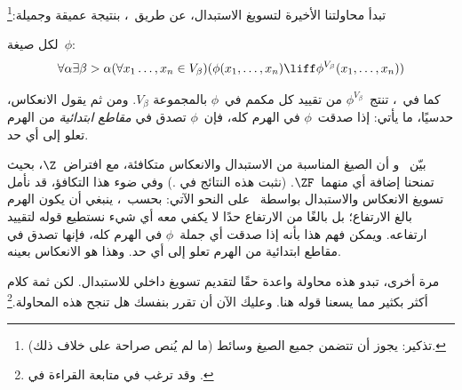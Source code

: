 \documentclass[../../../include/open-logic-section]{subfiles}
\begin{document}

تبدأ محاولتنا الأخيرة لتسويغ الاستبدال، عن طريق~\stagesinex، بنتيجة
عميقة وجميلة:\footnote{تذكير: يجوز أن تتضمن جميع الصيغ وسائط (ما لم
يُنص صراحة على خلاف ذلك).}
\begin{thm}
لكل صيغة~$\phi$:
\[
\forall \alpha \exists \beta > \alpha (\forall x_1 \ldots, x_n \in
V_\beta)(\phi(x_1, \ldots, x_n) \liff \phi^{V_\beta}(x_1, \ldots, x_n))
\]
\end{thm}
\noindent
كما في~،
تنتج~$\phi^{V_\beta}$ من تقييد كل مكمم في~$\phi$ بالمجموعة
$V_\beta$. ومن ثم يقول الانعكاس، حدسيًا، ما يأتي: إذا صدقت~$\phi$ في
الهرم كله، فإن~$\phi$ تصدق في \emph{مقاطع ابتدائية} من الهرم تعلو
إلى أي حد.

بيّن~\citet{Montague1961} و\citet{Levy1960} أن الصيغ المناسبة من
الاستبدال والانعكاس متكافئة، مع افتراض~$\Z$، بحيث تمنحنا إضافة أي
منهما~$\ZF$. (نثبت هذه النتائج في
.) وفي ضوء هذا التكافؤ، قد
نأمل تسويغ الانعكاس والاستبدال بواسطة~\stagesinex{} على النحو الآتي:
بحسب~\stagesinex، ينبغي أن يكون الهرم بالغ الارتفاع؛ بل بالغًا من
الارتفاع حدًا لا يكفي معه أي شيء نستطيع قوله لتقييد ارتفاعه. ويمكن
فهم هذا بأنه إذا صدقت أي جملة~$\phi$ في الهرم كله، فإنها تصدق في
مقاطع ابتدائية من الهرم تعلو إلى أي حد. وهذا هو الانعكاس بعينه.

مرة أخرى، تبدو هذه محاولة واعدة حقًا لتقديم تسويغ داخلي للاستبدال.
لكن ثمة كلام أكثر بكثير مما يسعنا قوله هنا. وعليك الآن أن تقرر بنفسك
هل تنجح هذه المحاولة.\footnote{وقد ترغب في متابعة القراءة في
\citet[95--100]{Incurvati2020}.}
\end{document}
